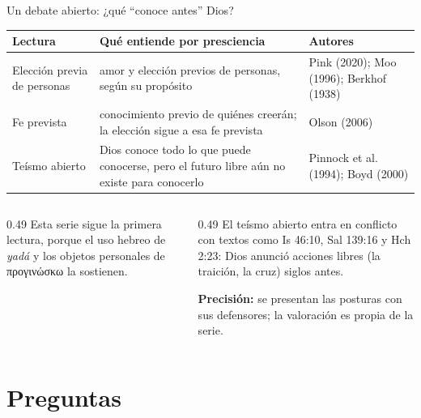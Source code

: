 \documentclass[hyperref={bookmarks=false},aspectratio=169]{beamer}
\newcommand{\grc}[1]{\foreignlanguage{ancientgreek}{#1}}
\newcommand{\precision}[1]{{\footnotesize\color{gris}\textbf{Precisión:} #1}}
\begin{document}
\begin{frame}{Un debate abierto: ¿qué ``conoce antes'' Dios?}
\scriptsize\renewcommand{\arraystretch}{1.2}
\begin{tabular}{@{}>{\RaggedRight\arraybackslash}p{2.6cm}>{\RaggedRight\arraybackslash}p{5.5cm}>{\RaggedRight\arraybackslash}p{3.7cm}@{}}
\toprule
\textbf{Lectura} & \textbf{Qué entiende por presciencia} & \textbf{Autores} \\ \midrule
Elección previa de personas & amor y elección previos de personas, según su propósito & Pink (2020); Moo (1996); Berkhof (1938) \\
Fe prevista & conocimiento previo de quiénes creerán; la elección sigue a esa fe prevista & Olson (2006) \\
Teísmo abierto & Dios conoce todo lo que puede conocerse, pero el futuro libre aún no existe para conocerlo & Pinnock et al. (1994); Boyd (2000) \\
\bottomrule
\end{tabular}\par\medskip
\begin{columns}[t,onlytextwidth]
\begin{column}{0.49\textwidth}\small
Esta serie sigue la primera lectura, porque el uso hebreo de \emph{yadá} y los objetos personales de \grc{προγινώσκω} la sostienen.
\end{column}
\begin{column}{0.49\textwidth}\scriptsize
El teísmo abierto entra en conflicto con textos como Is 46:10, Sal 139:16 y Hch 2:23: Dios anunció acciones libres (la traición, la cruz) siglos antes.\par\smallskip
\precision{se presentan las posturas con sus defensores; la valoración es propia de la serie.}
\end{column}
\end{columns}
\end{frame}

\section{Preguntas}
\end{document}
